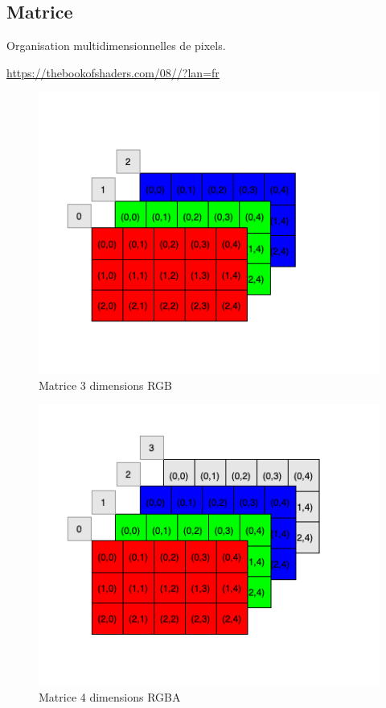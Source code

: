 \documentclass[
  french,
]{book}
\begin{document}
\hypertarget{matrice}{%
\subsection{Matrice}\label{matrice}}

Organisation multidimensionnelles de pixels.

\url{https://thebookofshaders.com/08//?lan=fr}

\begin{figure}
\centering
\includegraphics{medias/traiter/figures/dia_matrice_RGB.png}
\caption{Matrice 3 dimensions RGB}
\end{figure}

\begin{figure}
\centering
\includegraphics{medias/traiter/figures/dia_matrice_RGBA.png}
\caption{Matrice 4 dimensions RGBA}
\end{figure}
\end{document}
